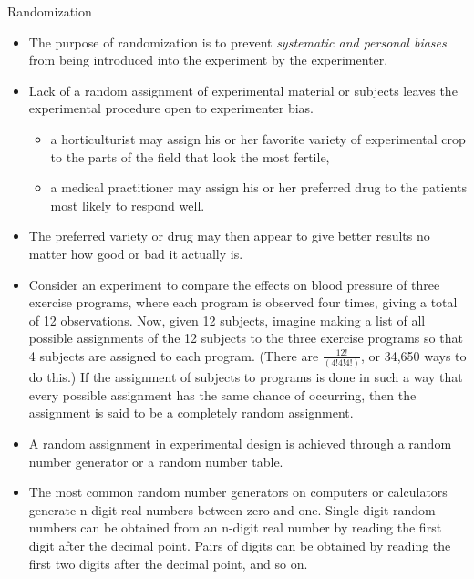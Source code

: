 \documentclass[
  ignorenonframetext,
  aspectratio=169]{beamer}
\providecommand{\tightlist}{%
  \setlength{\itemsep}{0pt}\setlength{\parskip}{0pt}}
\begin{document}
\begin{frame}{Randomization}
\protect\hypertarget{randomization}{}
\begin{itemize}
\tightlist
\item
  The purpose of randomization is to prevent \emph{systematic and
  personal biases} from being introduced into the experiment by the
  experimenter.
\end{itemize}

\begin{itemize}
\tightlist
\item
  Lack of a random assignment of experimental material or subjects
  leaves the experimental procedure open to \alert{experimenter bias}.

  \begin{itemize}
  \tightlist
  \item
    a horticulturist may assign his or her favorite variety of
    experimental crop to the parts of the field that look the most
    fertile,
  \item
    a medical practitioner may assign his or her preferred drug to the
    patients most likely to respond well.
  \end{itemize}
\item
  The preferred variety or drug may then appear to give better results
  no matter how good or bad it actually is.
\end{itemize}
\end{frame}

\begin{frame}{}
\protect\hypertarget{section-1}{}
\begin{itemize}
\tightlist
\item
  Consider an experiment to compare the effects on blood pressure of
  three exercise programs, where each program is observed four times,
  giving a total of 12 observations. Now, given 12 subjects, imagine
  making a list of all possible assignments of the 12 subjects to the
  three exercise programs so that 4 subjects are assigned to each
  program. (There are \(\frac{12!}{(4!4!4!)}\), or 34,650 ways to do
  this.) If the assignment of subjects to programs is done in such a way
  that every possible assignment has the same chance of occurring, then
  the assignment is said to be a completely random assignment.
\item
  A random assignment in experimental design is achieved through a
  random number generator or a random number table.
\end{itemize}

\begin{itemize}
\tightlist
\item
  The most common random number generators on computers or calculators
  generate n-digit real numbers between zero and one. Single digit
  random numbers can be obtained from an n-digit real number by reading
  the first digit after the decimal point. Pairs of digits can be
  obtained by reading the first two digits after the decimal point, and
  so on.
\end{itemize}
\end{frame}
\end{document}
